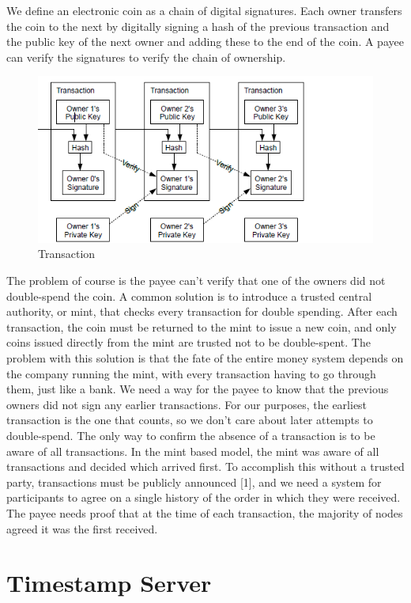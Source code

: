 We define an electronic coin as a chain of digital signatures. Each owner transfers the coin to the
next by digitally signing a hash of the previous transaction and the public key of the next owner
and adding these to the end of the coin. A payee can verify the signatures to verify the chain of
ownership.

\begin{figure}[ht!]
\centering
\includegraphics[trim = 0mm 0mm 30mm 0mm, width=120mm]{images/transaction}
\caption{Transaction}
\end{figure}

The problem of course is the payee can't verify that one of the owners did not double-spend
the coin. A common solution is to introduce a trusted central authority, or mint, that checks every
transaction for double spending. After each transaction, the coin must be returned to the mint to
issue a new coin, and only coins issued directly from the mint are trusted not to be double-spent.
The problem with this solution is that the fate of the entire money system depends on the
company running the mint, with every transaction having to go through them, just like a bank.
We need a way for the payee to know that the previous owners did not sign any earlier
transactions. For our purposes, the earliest transaction is the one that counts, so we don't care
about later attempts to double-spend. The only way to confirm the absence of a transaction is to
be aware of all transactions. In the mint based model, the mint was aware of all transactions and
decided which arrived first. To accomplish this without a trusted party, transactions must be
publicly announced [1], and we need a system for participants to agree on a single history of the
order in which they were received. The payee needs proof that at the time of each transaction, the
majority of nodes agreed it was the first received.

\section{Timestamp Server}

